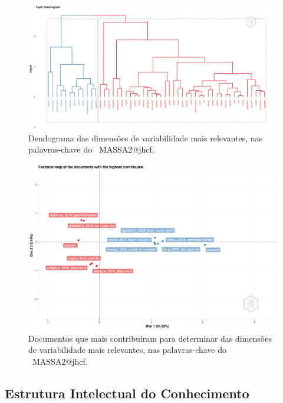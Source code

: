 \begin{figure}
    \centering
    \includegraphics[width=1\textwidth]{experiments/jhcf/PesqBibliogr/SimulacaoMultiagente/WoS-20220203/Estrutura/Conceitual/MASSA2-FactorialAnalysis-MCA-Dendrogram.png}
    \caption{Dendograma das dimensões de variabilidade mais relevantes, nas palavras-chave do  \dataset\ MASSA2@jhcf.}
    \label{fig:MASSA2-FactorialAnalysis-MCA-Dendrogram}
\end{figure}

\begin{figure}
    \centering
    \includegraphics[width=1\textwidth]{experiments/jhcf/PesqBibliogr/SimulacaoMultiagente/WoS-20220203/Estrutura/Conceitual/MASSA2-FactorialAnalysis-MCA-MostContribDocuments.png}
    \caption{Documentos que mais contribuíram para determinar das dimensões de variabilidade mais relevantes, nas palavras-chave do  \dataset\ MASSA2@jhcf.}
    \label{fig:MASSA2-FactorialAnalysis-MCA-MostContribDocuments}
\end{figure}

\subsection{Estrutura Intelectual  do Conhecimento}

